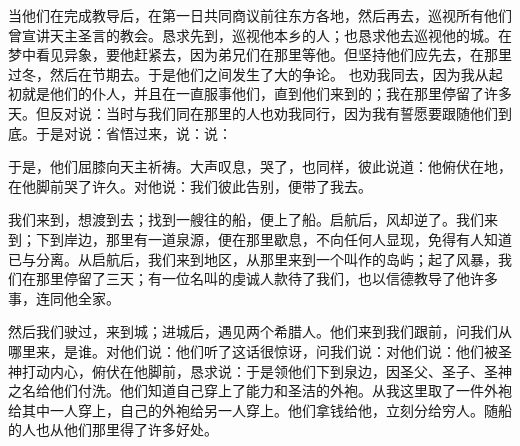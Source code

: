 当他们在完成教导后，在第一日共同商议前往东方各地，然后再去，巡视所有他们曾宣讲天主圣言的教会。恳求先到，巡视他本乡的人；也恳求他去巡视他的城。在梦中看见异象，要他赶紧去，因为弟兄们在那里等他。但坚持他们应先去，在那里过冬，然后在节期去。于是他们之间发生了大的争论。 也劝我同去，因为我从起初就是他们的仆人，并且在一直服事他们，直到他们来到的；我在那里停留了许多天。但反对说：当时与我们同在那里的人也劝我同行，因为我有誓愿要跟随他们到底。于是对说：省悟过来，说：说：\par

于是，他们屈膝向天主祈祷。大声叹息，哭了，也同样，彼此说道：他俯伏在地，在他脚前哭了许久。对他说：我们彼此告别，便带了我去。\par

我们来到，想渡到去；找到一艘往的船，便上了船。启航后，风却逆了。我们来到；下到岸边，那里有一道泉源，便在那里歇息，不向任何人显现，免得有人知道已与分离。从启航后，我们来到地区，从那里来到一个叫作的岛屿；起了风暴，我们在那里停留了三天；有一位名叫的虔诚人款待了我们，也以信德教导了他许多事，连同他全家。\par

然后我们驶过，来到城；进城后，遇见两个希腊人。他们来到我们跟前，问我们从哪里来，是谁。对他们说：他们听了这话很惊讶，问我们说：对他们说：他们被圣神打动内心，俯伏在他脚前，恳求说：于是领他们下到泉边，因圣父、圣子、圣神之名给他们付洗。他们知道自己穿上了能力和圣洁的外袍。从我这里取了一件外袍给其中一人穿上，自己的外袍给另一人穿上。他们拿钱给他，立刻分给穷人。随船的人也从他们那里得了许多好处。\par

